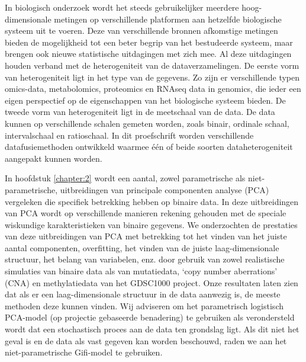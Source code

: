 \samenvatting
In biologisch onderzoek wordt het steeds gebruikelijker meerdere hoog-di\-men\-sionale metingen op verschillende platformen aan hetzelfde biologische systeem uit te voeren. Deze van verschillende bronnen afkomstige metingen bieden de mogelijkheid tot een beter begrip van het bestudeerde systeem, maar brengen ook nieuwe statistische uitdagingen met zich mee. Al deze uitdagingen houden verband met de heterogeniteit van de dataverzamelingen. De eerste vorm van heterogeniteit ligt in het type van de gegevens. Zo zijn er verschillende typen omics-data, metabolomics, proteomics en RNAseq data in genomics, die ieder een eigen perspectief op de eigenschappen van het biologische systeem bieden. De tweede vorm van heterogeniteit ligt in de meetschaal van de data. De data kunnen op verschillende schalen gemeten worden, zoals binair, ordinale schaal, intervalschaal en ratioschaal. In dit proefschrift worden verschillende datafusiemethoden ontwikkeld waarmee één of beide soorten dataheterogeniteit aangepakt kunnen worden.

In hoofdstuk \ref{chapter:2} wordt een aantal, zowel parametrische als niet-para\-me\-tri\-sche, uitbreidingen van principale componenten analyse (PCA) vergeleken die specifiek betrekking hebben op binaire data. In deze uitbreidingen van PCA wordt op verschillende manieren rekening gehouden met de speciale wiskundige karakteristieken van binaire gegevens. We onderzochten de prestaties van deze uitbreidingen van PCA met betrekking tot het vinden van het juiste aantal componenten, overfitting, het vinden van de juiste laag-dimensionale structuur, het belang van variabelen, enz. door gebruik van zowel realistische simulaties van binaire data als van mutatiedata, `copy number aberrations' (CNA) en methylatiedata van het GDSC1000 project. Onze resultaten laten zien dat als er een laag-dimensionale structuur in de data aanwezig is, de meeste methoden deze kunnen vinden. Wij adviseren om het parametrisch logistisch PCA-model (op projectie gebaseerde benadering) te gebruiken als verondersteld wordt dat een stochastisch proces aan de data ten grondslag ligt. Als dit niet het geval is en de data als vast gegeven kan worden beschouwd, raden we aan het niet-parametrische Gifi-model te gebruiken.

